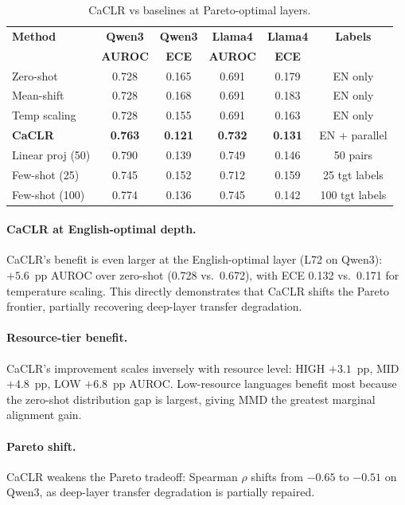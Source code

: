 \documentclass[11pt,a4paper]{article}
\begin{document}
\begin{table}[t]
\centering
\caption{CaCLR vs baselines at Pareto-optimal layers.}
\label{tab:caclr_main}
\small
\begin{tabular}{lccccc}
\toprule
\textbf{Method} & \textbf{Qwen3} & \textbf{Qwen3} & \textbf{Llama4} & \textbf{Llama4} & \textbf{Labels} \\
 & \textbf{AUROC} & \textbf{ECE} & \textbf{AUROC} & \textbf{ECE} & \\
\midrule
Zero-shot      & 0.728 & 0.165 & 0.691 & 0.179 & EN only \\
Mean-shift     & 0.728 & 0.168 & 0.691 & 0.183 & EN only \\
Temp scaling   & 0.728 & 0.155 & 0.691 & 0.163 & EN only \\
\textbf{CaCLR} & \textbf{0.763} & \textbf{0.121} & \textbf{0.732} & \textbf{0.131} & EN + parallel \\
Linear proj (50)& 0.790 & 0.139 & 0.749 & 0.146 & 50 pairs \\
Few-shot (25)  & 0.745 & 0.152 & 0.712 & 0.159 & 25 tgt labels \\
Few-shot (100) & 0.774 & 0.136 & 0.745 & 0.142 & 100 tgt labels \\
\bottomrule
\end{tabular}
\end{table}

\paragraph{CaCLR at English-optimal depth.}
CaCLR's benefit is even larger at the English-optimal layer (L72 on Qwen3): $+5.6$~pp AUROC over zero-shot (0.728 vs.\ 0.672), with ECE 0.132 vs.\ 0.171 for temperature scaling.
This directly demonstrates that CaCLR shifts the Pareto frontier, partially recovering deep-layer transfer degradation.

\paragraph{Resource-tier benefit.}
CaCLR's improvement scales inversely with resource level: HIGH $+3.1$~pp, MID $+4.8$~pp, LOW $+6.8$~pp AUROC.
Low-resource languages benefit most because the zero-shot distribution gap is largest, giving MMD the greatest marginal alignment gain.

\paragraph{Pareto shift.}
CaCLR weakens the Pareto tradeoff: Spearman $\rho$ shifts from $-0.65$ to $-0.51$ on Qwen3, as deep-layer transfer degradation is partially repaired.
\end{document}
